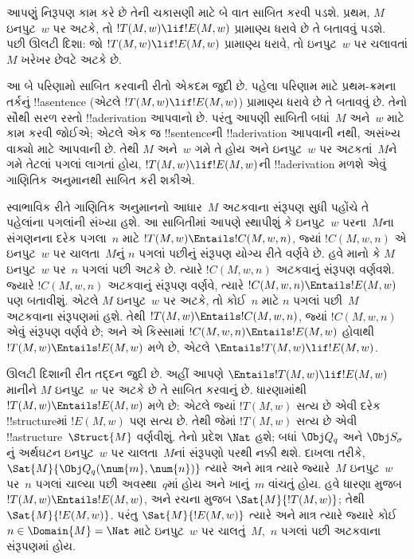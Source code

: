 \documentclass[../../../include/open-logic-section]{subfiles}
\begin{document}

\begin{explain}
આપણું નિરૂપણ કામ કરે છે તેની ચકાસણી માટે બે વાત
સાબિત કરવી પડશે. પ્રથમ, $M$ ઇનપુટ~$w$ પર અટકે,
તો $!T(M, w) \lif !E(M, w)$ પ્રામાણ્ય ધરાવે છે તે
બતાવવું પડશે. પછી ઊલટી દિશા: જો
$!T(M, w) \lif !E(M, w)$ પ્રામાણ્ય ધરાવે, તો
ઇનપુટ~$w$ પર ચલાવતાં $M$ ખરેખર છેવટે અટકે છે.

આ બે પરિણામો સાબિત કરવાની રીતો એકદમ જુદી છે.
પહેલા પરિણામ માટે પ્રથમ-ક્રમના તર્કનું !!a{sentence}
(એટલે $!T(M, w) \lif !E(M, w)$) પ્રામાણ્ય ધરાવે છે
તે બતાવવું છે. તેનો સૌથી સરળ રસ્તો !!a{derivation}
આપવાનો છે. પરંતુ આપણી સાબિતી બધાં~$M$ અને~$w$
માટે કામ કરવી જોઈએ; એટલે એક જ !!{sentence}ની
!!a{derivation} આપવાની નથી, અસંખ્ય વાક્યો માટે
આપવાની છે. તેથી $M$ અને~$w$ ગમે તે હોય અને
ઇનપુટ~$w$ પર અટકતાં~$M$ને ગમે તેટલાં પગલાં લાગતાં
હોય, $!T(M, w) \lif !E(M, w)$ની !!a{derivation}
મળશે એવું ગાણિતિક અનુમાનથી સાબિત કરી શકીએ.

સ્વાભાવિક રીતે ગાણિતિક અનુમાનનો આધાર~$M$ અટકવાના સંરૂપણ
સુધી પહોંચે તે પહેલાંના પગલાંની સંખ્યા હશે. આ
સાબિતીમાં આપણે સ્થાપીશું કે ઇનપુટ~$w$ પરના~$M$ના
સંગણનના દરેક પગલા~$n$ માટે
$!T(M, w) \Entails !C(M, w, n)$, જ્યાં
$!C(M, w, n)$ એ ઇનપુટ~$w$ પર ચાલતા~$M$નું
$n$ પગલાં પછીનું સંરૂપણ યોગ્ય રીતે વર્ણવે છે.
હવે માનો કે $M$ ઇનપુટ~$w$
પર~$n$ પગલાં પછી અટકે છે. ત્યારે
$!C(M, w, n)$ અટકવાનું સંરૂપણ વર્ણવશે. જ્યારે
$!C(M, w, n)$ અટકવાનું સંરૂપણ વર્ણવે, ત્યારે
$!C(M, w, n) \Entails !E(M, w)$ પણ બતાવીશું.
  એટલે $M$ ઇનપુટ~$w$ પર અટકે, તો કોઈ~$n$ માટે
$n$ પગલાં પછી~$M$ અટકવાના સંરૂપણમાં હશે. તેથી
$!T(M, w) \Entails !C(M, w, n)$, જ્યાં
$!C(M, w, n)$ એવું સંરૂપણ વર્ણવે છે; અને એ કિસ્સામાં
$!C(M, w, n) \Entails !E(M, w)$ હોવાથી
$!T(M, w) \Entails !E(M, w)$ મળે છે, એટલે
$\Entails !T(M, w) \lif !E(M, w)$.

ઊલટી દિશાની રીત તદ્દન જુદી છે. અહીં આપણે
$\Entails !T(M, w) \lif !E(M, w)$ માનીને
$M$ ઇનપુટ~$w$ પર અટકે છે તે સાબિત કરવાનું છે.
ધારણામાંથી $!T(M, w) \Entails !E(M, w)$ મળે છે:
એટલે જ્યાં $!T(M, w)$ સત્ય છે એવી દરેક
!!{structure}માં $!E(M, w)$ પણ સત્ય છે. તેથી
જેમાં $!T(M, w)$ સત્ય છે એવી
!!a{structure}~$\Struct{M}$ વર્ણવીશું. તેનો પ્રદેશ
$\Nat$ હશે; બધાં $\Obj Q_q$ અને $\Obj S_\sigma$
નું અર્થઘટન ઇનપુટ~$w$ પર ચાલતા~$M$નાં
સંરૂપણો પરથી નક્કી થશે. દાખલા તરીકે,
$\Sat{M}{\Obj Q_q(\num{m}, \num{n})}$ ત્યારે અને માત્ર
ત્યારે જ્યારે~$M$ ઇનપુટ~$w$ પર~$n$ પગલાં ચાલ્યા
પછી અવસ્થા~$q$માં હોય અને ખાનું~$m$ વાંચતું હોય.
હવે ધારણા મુજબ $!T(M, w) \Entails !E(M, w)$,
અને રચના મુજબ $\Sat{M}{!T(M, w)}$;
તેથી $\Sat{M}{!E(M, w)}$. પરંતુ
$\Sat{M}{!E(M, w)}$ ત્યારે અને માત્ર ત્યારે જ્યારે
કોઈ $n \in \Domain{M} = \Nat$ માટે ઇનપુટ~$w$
પર ચાલતું~$M$,~$n$ પગલાં પછી અટકવાના
સંરૂપણમાં હોય.
\end{explain}
\end{document}
